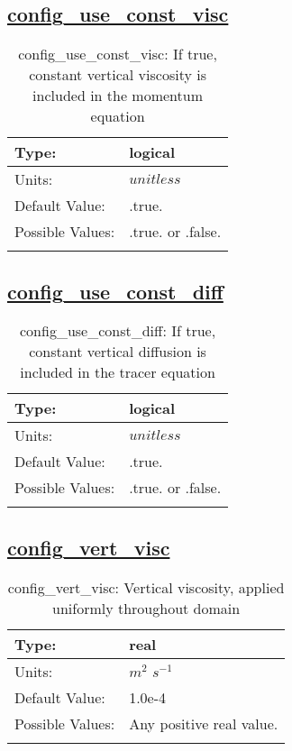 \subsection[config\_use\_const\_visc]{\hyperref[sec:nm_tab_vmix_const]{config\_use\_const\_visc}}
\label{subsec:nm_sec_config_use_const_visc}
\begin{center}
\begin{longtable}{| p{2.0in} | p{4.0in} |}
    \hline
    Type: & logical \\
    \hline
    Units: & $unitless$ \\
    \hline
    Default Value: & .true. \\
    \hline
    Possible Values: & .true. or .false. \\
    \hline
    \caption{config\_use\_const\_visc: If true, constant vertical viscosity is included in the momentum equation}
\end{longtable}
\end{center}
\subsection[config\_use\_const\_diff]{\hyperref[sec:nm_tab_vmix_const]{config\_use\_const\_diff}}
\label{subsec:nm_sec_config_use_const_diff}
\begin{center}
\begin{longtable}{| p{2.0in} | p{4.0in} |}
    \hline
    Type: & logical \\
    \hline
    Units: & $unitless$ \\
    \hline
    Default Value: & .true. \\
    \hline
    Possible Values: & .true. or .false. \\
    \hline
    \caption{config\_use\_const\_diff: If true, constant vertical diffusion is included in the tracer equation}
\end{longtable}
\end{center}
\subsection[config\_vert\_visc]{\hyperref[sec:nm_tab_vmix_const]{config\_vert\_visc}}
\label{subsec:nm_sec_config_vert_visc}
\begin{center}
\begin{longtable}{| p{2.0in} | p{4.0in} |}
    \hline
    Type: & real \\
    \hline
    Units: & $m^2$ $s^{-1}$ \\
    \hline
    Default Value: & 1.0e-4 \\
    \hline
    Possible Values: & Any positive real value. \\
    \hline
    \caption{config\_vert\_visc: Vertical viscosity, applied uniformly throughout domain}
\end{longtable}
\end{center}
